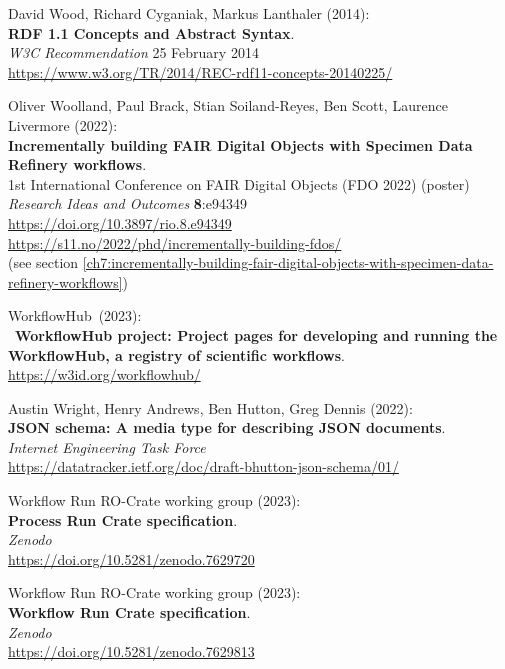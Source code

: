 \begin{thebibliography}{9}
David Wood, Richard Cyganiak, Markus Lanthaler (2014): \\
\textbf{RDF 1.1 Concepts and Abstract Syntax}.\\
\emph{W3C Recommendation} 25 February 2014\\
\url{https://www.w3.org/TR/2014/REC-rdf11-concepts-20140225/}

Oliver Woolland, Paul Brack, Stian Soiland-Reyes, Ben Scott, Laurence
Livermore (2022):\\
\textbf{Incrementally building FAIR Digital Objects with Specimen Data
Refinery workflows}.\\
1st International Conference on FAIR Digital Objects
(FDO 2022) (poster)\\
\emph{Research Ideas and Outcomes} \textbf{8}:e94349\\
\url{https://doi.org/10.3897/rio.8.e94349}\\
\url{https://s11.no/2022/phd/incrementally-building-fdos/}\\
(see section \vref{ch7:incrementally-building-fair-digital-objects-with-specimen-data-refinery-workflows})

WorkflowHub~(2023):\\
~\textbf{WorkflowHub project: Project pages for developing and
running the WorkflowHub, a registry of scientific workflows}.\\
\url{https://w3id.org/workflowhub/}

Austin Wright, Henry Andrews, Ben Hutton, Greg Dennis (2022):\\
\textbf{JSON schema: A media type for describing JSON documents}.\\
\emph{Internet Engineering Task Force}\\
\url{https://datatracker.ietf.org/doc/draft-bhutton-json-schema/01/}

Workflow Run RO-Crate working group (2023):\\
\textbf{Process Run Crate specification}.\\
\emph{Zenodo}\\
\url{https://doi.org/10.5281/zenodo.7629720}

Workflow Run RO-Crate working group (2023):\\
\textbf{Workflow Run Crate specification}.\\
\emph{Zenodo}\\
\url{https://doi.org/10.5281/zenodo.7629813}


\end{thebibliography}
